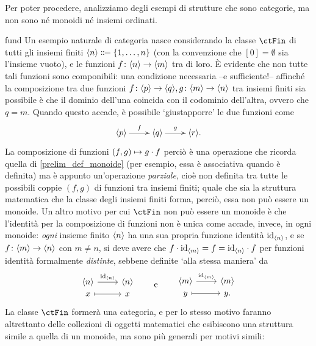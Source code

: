 Per poter procedere, analizziamo degli esempi di strutture che sono categorie, ma non sono né monoidi né insiemi ordinati.
\begin{hExample}{fund}\label{protoex_finset}
 Un esempio naturale di categoria nasce considerando la classe \(\ctFin\) di tutti gli insiemi finiti \(\bkt{n}\defeq \{\iter n\}\) (con la convenzione che \([0]=\emptyset\) sia l'insieme vuoto), e le funzioni \(f \colon \langle n\rangle \to \langle m\rangle\) tra di loro. È evidente che non tutte tali funzioni sono componibili: una condizione necessaria --e sufficiente!-- affinché la composizione tra due funzioni \(f \colon \langle p\rangle \to \langle q\rangle,g \colon \langle m\rangle \to \langle n\rangle\) tra insiemi finiti sia possibile è che il dominio dell'una coincida con il codominio dell'altra, ovvero che \(q=m\). Quando questo accade, è possibile `giustapporre' le due funzioni come
 \[\xymatrix{
   \bkt{p} \ar[r]^-f & \bkt{q} \ar[r]^-g & \bkt{r}.
  }\]
 La composizione di funzioni \((f,g)\mapsto g\cdot f\) perciò è una operazione che ricorda quella di \ref{prelim_def_monoide} (per esempio, essa è associativa quando è definita) ma è appunto un'operazione \emph{parziale}, cioè non definita tra tutte le possibili coppie \((f,g)\) di funzioni tra insiemi finiti; quale che sia la struttura matematica che la classe degli insiemi finiti forma, perciò, essa non può essere un monoide. Un altro motivo per cui \(\ctFin\) non può essere un monoide è che l'identità per la composizione di funzioni non è unica come accade, invece, in ogni monoide: \emph{ogni} insieme finito \(\langle n\rangle\) ha una sua propria funzione identità \(\mathrm{id}_{\langle n\rangle}\), e se \(f \colon \langle m\rangle\to \langle n\rangle\) con \(m\ne n\), si deve avere che \(f\cdot \mathrm{id}_{\langle m\rangle}=f=\mathrm{id}_{\langle n\rangle}\cdot f\) per funzioni identità formalmente \emph{distinte}, sebbene definite `alla stessa maniera' da
 \[
  \begin{tikzcd}[row sep=0]
   {\bkt{n}} \ar{r}{\id_{\bkt{n}}} & {\bkt{n}} \\
   x \ar[mapsto]{r} & x
  \end{tikzcd}
  \qquad\mbox{e}\qquad
  \begin{tikzcd}[row sep=0]
   {\bkt{m}} \ar{r}{\id_{\bkt{m}}} & {\bkt{m}} \\
   y \ar[mapsto]{r} & y .
  \end{tikzcd}
 \]
 La classe \(\ctFin\) formerà una categoria, e per lo stesso motivo faranno altrettanto delle collezioni di oggetti matematici che esibiscono una struttura simile a quella di un monoide, ma sono più generali per motivi simili:

\end{hExample}
